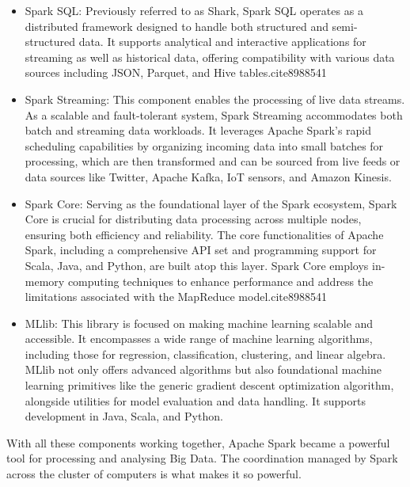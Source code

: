 \begin{itemize}
    \item Spark SQL: Previously referred to as Shark, Spark SQL operates as a distributed framework designed to handle both structured and semi-structured 
    data. It supports analytical and interactive applications for streaming as well as historical data, offering compatibility with various data sources 
    including JSON, Parquet, and Hive tables.cite{8988541}

    \item Spark Streaming: This component enables the processing of live data streams. As a scalable and fault-tolerant system, Spark Streaming accommodates both batch 
    and streaming data workloads. It leverages Apache Spark's rapid scheduling capabilities by organizing incoming data into small batches for processing, which are then 
    transformed and can be sourced from live feeds or data sources like Twitter, Apache Kafka, IoT sensors, and Amazon Kinesis.\cite{8988541}

    \item Spark Core: Serving as the foundational layer of the Spark ecosystem, Spark Core is crucial for distributing data processing across multiple nodes, ensuring both efficiency and reliability. The core functionalities of Apache Spark, including a comprehensive API set and programming support for Scala, Java, and Python, are built atop this layer. Spark Core employs in-memory computing techniques to enhance performance and address the limitations associated with the MapReduce model.cite{8988541}

    \item MLlib: This library is focused on making machine learning scalable and accessible. It encompasses a wide range of machine learning algorithms, including those for regression, classification, clustering, and linear algebra. MLlib not only offers advanced algorithms but also foundational machine learning primitives like the generic gradient descent optimization algorithm, alongside utilities for model evaluation and data handling. It supports development in Java, Scala, and Python. \cite{8988541}
    
\end{itemize}

With all these components working together, Apache Spark became a powerful tool for processing and analysing Big Data. The coordination managed by Spark across the cluster of computers 
is what makes it so powerful. 

